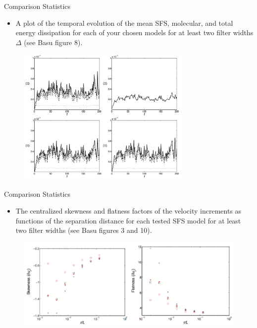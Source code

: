 \begin{frame}{Comparison Statistics}
    \begin{itemize}
	\item A plot of the temporal evolution of the mean SFS, molecular, and total energy dissipation for each of your chosen models for at least two filter widths $\Delta$ (see Basu figure 8).
	\end{itemize}
     \begin{figure}
      \includegraphics[width=0.75\textwidth]{basu8}
    \end{figure}
\end{frame}

\begin{frame}{Comparison Statistics}
    \begin{itemize}
	\item The centralized skewness and flatness factors of the velocity increments as functions of the separation distance for each tested SFS model for at least two filter widths (see Basu figures 3 and 10). 
	\end{itemize}
     \begin{figure}
      \includegraphics[width=1\textwidth]{basu10}
    \end{figure}
\end{frame}

